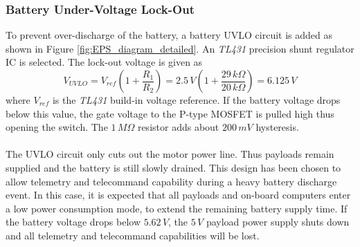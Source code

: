 \subsubsection{Battery Under-Voltage Lock-Out}
To prevent over-discharge of the battery, a battery \ac{UVLO} circuit is added as shown in Figure \ref{fig:EPS_diagram_detailed}. An \textit{TL431} precision shunt regulator \ac{IC} is selected. The lock-out voltage is given as
%
\begin{equation}
V_{UVLO}=V_{ref}(1+\dfrac{R_1}{R_2})=2.5\,V(1+\dfrac{29\,k \Omega}{20\,k \Omega})=6.125\,V
\end{equation}
%
where $V_{ref}$ is the \textit{TL431} build-in voltage reference. If the battery voltage drops below this value, the gate voltage to the P-type MOSFET is pulled high thus opening the switch. The $1\,M \Omega$ resistor adds about $200\,mV$ hysteresis. 
\\
\\
The \ac{UVLO} circuit only cuts out the motor power line. Thus payloads remain supplied and the battery is still slowly drained. This design has been chosen to allow  telemetry and telecommand capability during a heavy battery discharge event. In this case, it is expected that all payloads and on-board computers enter a low power consumption mode, to extend the remaining battery supply time. If the battery voltage drops below $5.62\,V$, the $5\,V$ payload power supply shuts down and all telemetry and telecommand capabilities will be lost.
%
%

